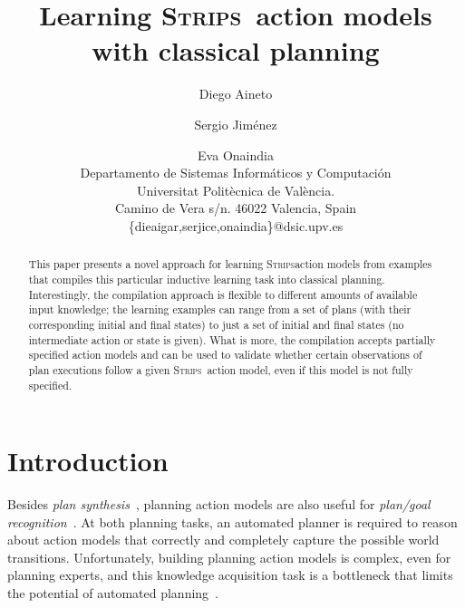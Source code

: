 \documentclass[letterpaper]{article} %
\newcommand{\strips}{\textsc{Strips}}     %
\begin{document}
\title{Learning \strips\ action models with classical planning}

\author{Diego Aineto\and Sergio Jim\'enez\and Eva Onaindia\\
{\small Departamento de Sistemas Inform\'aticos y Computaci\'on}\\
{\small Universitat Polit\`ecnica de Val\`encia.}\\
{\small Camino de Vera s/n. 46022 Valencia, Spain}\\
{\small \{dieaigar,serjice,onaindia\}@dsic.upv.es}}

\maketitle
\begin{abstract}
This paper presents a novel approach for learning \strips action models from examples that compiles this particular inductive learning task into classical planning. Interestingly, the compilation approach is flexible to different amounts of available input knowledge; the learning examples can range from a set of plans (with their corresponding initial and final states) to just a set of initial and final states (no intermediate action or state is given). What is more, the compilation accepts partially specified action models and can be used to validate whether certain observations of plan executions follow a given \strips\ action model, even if this model is not fully specified.
\end{abstract}


\section{Introduction}
Besides {\em plan synthesis}~\cite{ghallab2004automated,geffner:book:2013}, planning action models are also useful for {\em plan/goal recognition}~\cite{ramirez2012plan}. At both planning tasks, an automated planner is required to reason about action models that correctly and completely capture the possible world transitions. Unfortunately, building planning action models is complex, even for planning experts, and this knowledge acquisition task is a bottleneck that limits the potential of automated planning~\cite{kambhampati:modellite:AAAI2007}.
\end{document}
